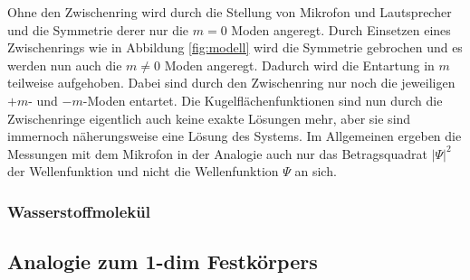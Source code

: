 Ohne den Zwischenring wird durch die Stellung von Mikrofon und Lautsprecher und die Symmetrie derer nur die $m=0$ Moden angeregt. Durch Einsetzen eines Zwischenrings wie in Abbildung \ref{fig:modell} wird die Symmetrie gebrochen und es werden nun auch die $m \neq 0$ Moden angeregt. Dadurch wird die Entartung in $m$ teilweise aufgehoben. Dabei sind durch den Zwischenring nur noch die jeweiligen $+m$- und $-m$-Moden entartet. Die Kugelflächenfunktionen sind nun durch die Zwischenringe eigentlich auch keine exakte Lösungen mehr, aber sie sind immernoch näherungsweise eine Lösung des Systems. Im Allgemeinen ergeben die Messungen mit dem Mikrofon in der Analogie auch nur das Betragsquadrat $|\Psi|^2$ der Wellenfunktion und nicht die Wellenfunktion $\Psi$ an sich.

\subsubsection{Wasserstoffmolekül}
\label{sec:ana-H2}



\subsection{Analogie zum 1-dim Festkörpers}
\label{ana-fest}

